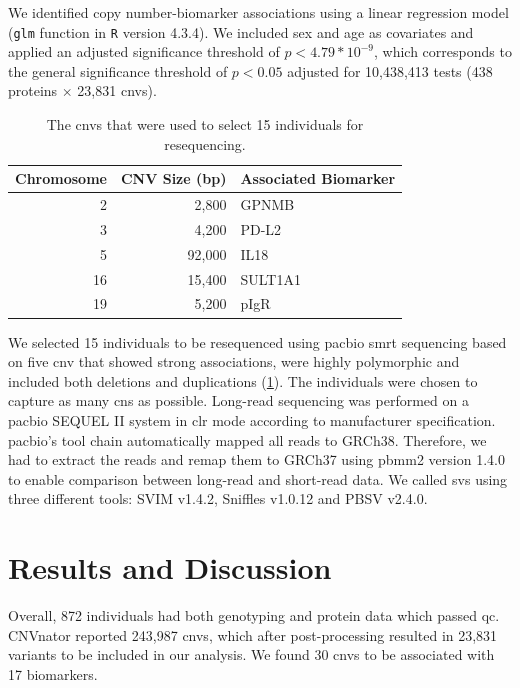 \documentclass[twoside=false]{scrbook}
\begin{document}
We identified copy number-biomarker associations using a linear regression model (\texttt{glm} function in \texttt{R} version 4.3.4).
We included sex and age as covariates and applied an adjusted significance threshold of \(p < 4.79*10^{-9}\), which corresponds to the general significance threshold of $p < 0.05$ adjusted for 10,438,413 tests (438 proteins $\times$ 23,831 \glspl{cnv}).

\begin{table}
    \centering
    \begin{tabular}{r r l}
        \toprule
        \textbf{Chromosome} & \textbf{CNV Size (bp)} & \textbf{Associated Biomarker} \\
        \midrule
        2 & 2,800 & GPNMB \\
        3 & 4,200 & PD-L2 \\
        5 & 92,000 & IL18 \\
        16 & 15,400 & SULT1A1 \\
        19 & 5,200 & pIgR \\
        \bottomrule
    \end{tabular}
    \caption{The \glspl{cnv} that were used to select 15 individuals for resequencing.}
    \label{tab:primecnvs}
\end{table}

We selected 15 individuals to be resequenced using \gls{pacbio} \gls{smrt} sequencing based on five \gls{cnv} that showed strong associations, were highly polymorphic and included both deletions and duplications (\cref{tab:primecnvs}).
The individuals were chosen to capture as many \glspl{cn} as possible.
Long-read sequencing was performed on a \gls{pacbio} SEQUEL II system in \gls{clr} mode according to manufacturer specification.
\gls{pacbio}'s tool chain automatically mapped all reads to GRCh38.
Therefore, we had to extract the reads and remap them to GRCh37 using \textsf{pbmm2} version 1.4.0 to enable comparison between long-read and short-read data.
We called \glspl{sv} using three different tools: \textsf{SVIM} v1.4.2, \textsf{Sniffles} v1.0.12 and \textsf{PBSV} v2.4.0.

\section{Results and Discussion}
Overall, 872 individuals had both genotyping and protein data which passed \gls{qc}.
\textsf{CNVnator} reported 243,987 \glspl{cnv}, which after post-processing resulted in 23,831 variants to be included in our analysis.
We found 30 \glspl{cnv} to be associated with 17 biomarkers.
\end{document}
